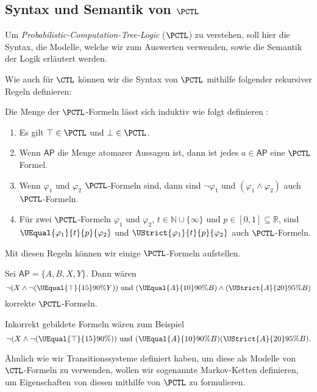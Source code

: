 \subsection{Syntax und Semantik von $\PCTL$}

Um \textit{Probabilistic-Computation-Tree-Logic} ($\PCTL$) zu verstehen, soll hier die Syntax, die Modelle, welche wir zum Auswerten verwenden, sowie die Semantik der Logik erläutert werden.

Wie auch für $\CTL$ können wir die Syntax von  $\PCTL$ mithilfe folgender rekursiver Regeln definieren:
\begin{definition}
	\label{SyntaxPCTL}
	Die Menge der $\PCTL$-Formeln lässt sich induktiv wie folgt definieren \cite{hansson1994logic}:
	\begin{enumerate}
		\item Es gilt $\top\in \PCTL$ und $\bot\in \PCTL$.
		\item Wenn $\mathsf{AP}$ die Menge atomarer Aussagen ist, dann ist jedes $a\in \mathsf{AP}$ eine $\PCTL$ Formel.
		\item Wenn $\varphi_1$ und $\varphi_2$ $\PCTL$-Formeln sind, dann sind $\neg\varphi_1$ und $(\varphi_1\land \varphi_2)$ auch $\PCTL$-Formeln.
		\item Für zwei $\PCTL$-Formeln $\varphi_1$ und $\varphi_2$, $t\in \mathbb{N}\cup\{\infty\}$ und $p\in [0,1]\subseteq\mathbb{R}$, sind $\UEqual{\varphi_1}{t}{p}{\varphi_2}$ und $\UStrict{\varphi_1}{t}{p}{\varphi_2}$ auch $\PCTL$-Formeln.
	\end{enumerate}
\end{definition}
Mit diesen Regeln können wir einige $\PCTL$-Formeln aufstellen.
\begin{example}
	\label{ExampleSyntax}
	Sei $\mathsf{AP}=\{A,B,X,Y\}$. Dann wären 
	$$\neg(X \land \neg(\UEqual{\top}{15}{90\%}{Y})) \text{ und } (\UEqual{A}{10}{90\%}{B}) \land (\UStrict{A}{20}{95\%}{B})$$ 
	korrekte $\PCTL$-Formeln.
	
	Inkorrekt gebildete Formeln wären zum Beispiel $$\neg(X \land \neg(\UEqual{\top}{15}{90\%}{})) \text{ und } (\UEqual{A}{10}{90\%}{B})(\UStrict{A}{20}{95\%}{B}).$$
\end{example}

Ähnlich wie wir Transitionssysteme definiert haben, um diese als Modelle von $\CTL$-Formeln zu verwenden, wollen wir sogenannte Markov-Ketten definieren, um Eigenschaften von diesen mithilfe von $\PCTL$ zu formulieren.

